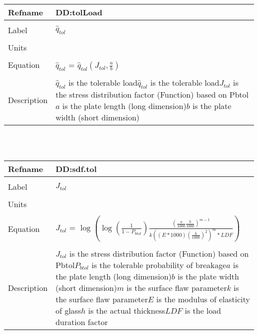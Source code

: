 \documentclass[12pt]{article}
\begin{document}
~\newline
\noindent \begin{minipage}{\textwidth}
\begin{tabular}{p{} p{}}
\toprule \textbf{Refname} & \textbf{DD:tolLoad}
\label{DD:tolLoad}
\\ \midrule \\
Label & $\hat{q}_{tol}$
\\ \midrule \\
Units & 
\\ \midrule \\
Equation & $\hat{q}_{tol}$ = $\hat{q}_{tol}\left(J_{tol},\frac{a}{b}\right)$
\\ \midrule \\
Description & $\hat{q}_{tol}$ is the tolerable load\newline$\hat{q}_{tol}$ is the tolerable load\newline$J_{tol}$ is the stress distribution factor (Function) based on Pbtol\newline$a$ is the plate length (long dimension)\newline$b$ is the plate width (short dimension)
\\ \bottomrule \end{tabular}
\end{minipage}\\
~\newline
\noindent \begin{minipage}{\textwidth}
\begin{tabular}{p{} p{}}
\toprule \textbf{Refname} & \textbf{DD:sdf.tol}
\label{DD:sdf.tol}
\\ \midrule \\
Label & $J_{tol}$
\\ \midrule \\
Units & 
\\ \midrule \\
Equation & $J_{tol}$ = $\log\left(\log\left(\frac{1}{1-P_{btol}}\right)\frac{\left(\frac{a}{1000}\frac{b}{1000}\right)^{m-1}}{k\left(\left(E*1000\right)\left(\frac{h}{1000}\right)^{2}\right)^{m}*LDF}\right)$
\\ \midrule \\
Description & $J_{tol}$ is the stress distribution factor (Function) based on Pbtol\newline$P_{btol}$ is the tolerable probability of breakage\newline$a$ is the plate length (long dimension)\newline$b$ is the plate width (short dimension)\newline$m$ is the surface flaw parameter\newline$k$ is the surface flaw parameter\newline$E$ is the modulus of elasticity of glass\newline$h$ is the actual thickness\newline$LDF$ is the load duration factor
\\ \bottomrule \end{tabular}
\end{minipage}\\
\end{document}
